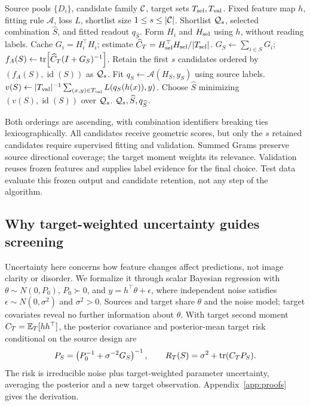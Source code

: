 \begin{algorithm}[H]
\caption{Target A-opt screening and validation}
\label{alg:target-a}
\begin{algorithmic}[1]
\Require Source pools $\{D_i\}$, candidate family $\mathcal{C}$, target sets $T_{\rm sel},T_{\rm val}$.
\Require Fixed feature map $h$, fitting rule $\mathcal A$, loss $L$, shortlist size $1\leq s\leq|\mathcal{C}|$.
\Ensure Shortlist $\mathcal{Q}_s$, selected combination $\widehat S$, and fitted readout $q_{\widehat S}$.
\State Form $H_i$ and $H_{\rm sel}$ using $h$, without reading labels.
\State Cache $G_i=H_i^\top H_i$; estimate $\widehat C_T=H_{\rm sel}^\top H_{\rm sel}/|T_{\rm sel}|$.
  \State $G_S\gets\sum_{i\in S}G_i$; $f_A(S)\gets\operatorname{tr}\!\left[\widehat C_T(I+G_S)^{-1}\right]$.
\EndFor
\State Retain the first $s$ candidates ordered by $(f_A(S),\operatorname{id}(S))$ as $\mathcal{Q}_s$.
  \State Fit $q_S\gets\mathcal A(H_S,y_S)$ using source labels.
  \State $v(S)\gets |T_{\rm val}|^{-1}\sum_{(x,y)\in T_{\rm val}}L(q_S(h(x)),y)$.
\EndFor
\State Choose $\widehat S$ minimizing $(v(S),\operatorname{id}(S))$ over $\mathcal{Q}_s$.
\State \Return $\mathcal{Q}_s,\widehat S,q_{\widehat S}$.
\end{algorithmic}
\end{algorithm}

Both orderings are ascending, with combination identifiers breaking ties lexicographically. All candidates receive geometric scores, but only the $s$ retained candidates require supervised fitting and validation. Summed Grams preserve source directional coverage; the target moment weights its relevance. Validation reuses frozen features and supplies label evidence for the final choice. Test data evaluate this frozen output and candidate retention, not any step of the algorithm.

\subsection{Why target-weighted uncertainty guides screening}
Uncertainty here concerns how feature changes affect predictions, not image clarity or disorder. We formalize it through scalar Bayesian regression with $\theta\sim N(0,P_0)$, $P_0\succ0$, and $y=h^\top\theta+\epsilon$, where independent noise satisfies $\epsilon\sim N(0,\sigma^2)$ and $\sigma^2>0$. Sources and target share $\theta$ and the noise model; target covariates reveal no further information about $\theta$. With target second moment $C_T=\mathbb{E}_T[hh^\top]$, the posterior covariance and posterior-mean target risk conditional on the source design are
\begin{equation}
 P_S=\left(P_0^{-1}+\sigma^{-2}G_S\right)^{-1},\qquad
 R_T(S)=\sigma^2+\operatorname{tr}(C_TP_S).
 \label{eq:risk}
\end{equation}
The risk is irreducible noise plus target-weighted parameter uncertainty, averaging the posterior and a new target observation. Appendix~\ref{app:proofs} gives the derivation.

